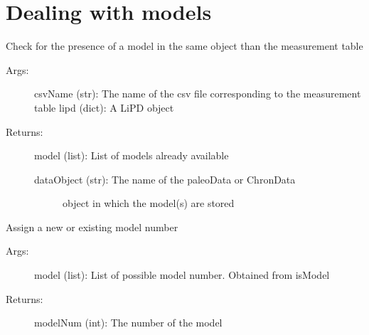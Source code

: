 \documentclass[letterpaper,10pt,english]{sphinxmanual}
\begin{document}
\section{Dealing with models}
\label{\detokenize{LipdUtils:dealing-with-models}}

\begin{fulllineitems}
\label{\detokenize{LipdUtils:pyleoclim.LipdUtils.isModel}}
Check for the presence of a model in the same object than the measurement table
\begin{description}
\item[{Args:}] \leavevmode
csvName (str): The name of the csv file corresponding to the measurement table
lipd (dict): A LiPD object

\item[{Returns:}] \leavevmode
model (list): List of models already available
\begin{description}
\item[{dataObject (str): The name of the paleoData or ChronData}] \leavevmode
object in which the model(s) are stored

\end{description}

\end{description}

\end{fulllineitems}


\begin{fulllineitems}
\label{\detokenize{LipdUtils:pyleoclim.LipdUtils.modelNumber}}
Assign a new or existing model number
\begin{description}
\item[{Args:}] \leavevmode
model (list): List of possible model number. Obtained from isModel

\item[{Returns:}] \leavevmode
modelNum (int): The number of the model

\end{description}

\end{fulllineitems}
\end{document}
